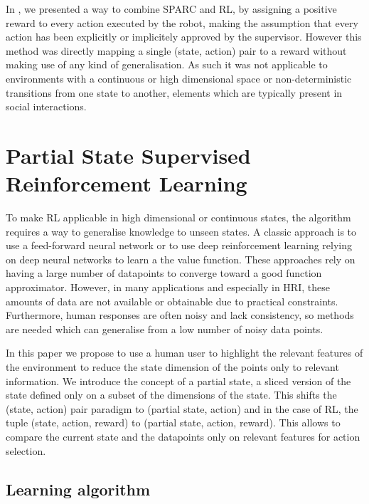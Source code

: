 \documentclass[letterpaper]{article} %
\begin{document}
In \cite{senft2017supervised}, we presented a way to combine SPARC and RL, by
assigning a positive reward to every action executed by the robot, making the
assumption that every action has been explicitly or implicitely approved by the
supervisor. However this method was  directly mapping a single (state, action)
pair to a reward without making use of any kind of generalisation. As such it
was not applicable to environments with a continuous or high dimensional space
or non-deterministic transitions from one state to another, elements which are
typically present in social interactions.

\section{Partial State Supervised Reinforcement Learning}

To make RL applicable in high dimensional or continuous states, the algorithm
requires a way to generalise knowledge to unseen states.  A classic approach is
to use a feed-forward neural network or to use deep reinforcement learning
relying on deep neural networks to learn a the value function.  These approaches
rely on having a large number of datapoints to converge toward a good function
approximator. However, in many applications and especially in HRI, these amounts
of data are not available or obtainable due to practical constraints.
Furthermore, human responses are often noisy and lack consistency, so methods
are needed which can generalise from a low number of noisy data points.


In this paper we propose to use a human user to highlight the relevant features
of the environment to reduce the state dimension of the points only to relevant
information.  We introduce the concept of a partial state, a sliced version of
the state defined only on a subset of the dimensions of the state. This shifts
the (state, action) pair paradigm to (partial state, action)  and in the case of
RL, the tuple (state, action, reward) to (partial state, action, reward). This
allows to compare the current state and the datapoints only on relevant features
for action selection.

\subsection{Learning algorithm}
\end{document}

